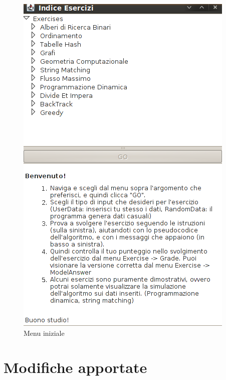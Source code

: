 \begin{figure}[htbp]
\centering
\includegraphics[scale=0.4]{images/Menu.png}
\caption{Menu iniziale}
\end{figure}


\section{\label{sec:Modifiche-apportate}Modifiche apportate}

